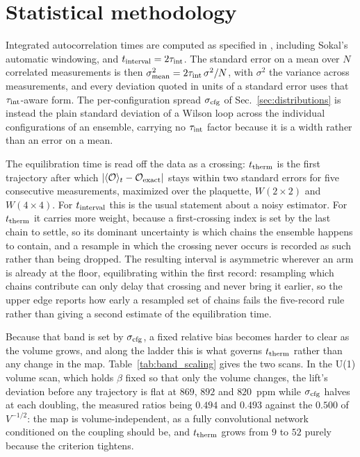 \documentclass[prd, twocolumn, superscriptaddress, nofootinbib,floatfix]{revtex4-2}
\DeclareRobustCommand{\sect}[1]{Sec.~\ref{sec:#1}}
\DeclareRobustCommand{\tb}[1]{Table~\ref{tab:#1}}
\begin{document}
\section{Statistical methodology}
\label{app:stats}

Integrated autocorrelation times are computed as specified in
\cite{madrassokal1988,wolff2004}, including Sokal's automatic windowing, and
$t_{\rm interval}=2\tau_{\rm int}$. The standard error on a mean over $N$
correlated measurements is then
$\sigma_{\rm mean}^2 = 2\tau_{\rm int}\,\sigma^2/N$, with $\sigma^2$ the
variance across measurements, and every deviation quoted in units of a standard
error uses that $\tau_{\rm int}$-aware form. The per-configuration spread
$\sigma_{\rm cfg}$ of \sect{distributions} is instead the plain standard
deviation of a Wilson loop across the individual configurations of an ensemble,
carrying no $\tau_{\rm int}$ factor because it is a width rather than an error
on a mean.

The equilibration time is read off the data as a crossing: $t_{\rm therm}$ is
the first trajectory after which $|\langle\mathcal{O}\rangle_t-\mathcal{O}_{\rm
exact}|$ stays within two standard errors for five consecutive measurements,
maximized over the plaquette, $W(2\times2)$ and $W(4\times4)$. For
$t_{\rm interval}$ this is the usual
statement about a noisy estimator. For $t_{\rm therm}$ it carries more weight,
because a first-crossing index is set by the last chain to settle, so its
dominant uncertainty is which chains the ensemble happens to contain, and a
resample in which the crossing never occurs is recorded as such rather than
being dropped. The resulting interval is asymmetric wherever an arm is already
at the floor, equilibrating within the first record: resampling which chains
contribute can only delay that crossing and never bring it earlier, so the upper
edge reports how early a resampled set of chains fails the five-record rule
rather than giving a second estimate of the equilibration time.

Because that band is set by $\sigma_{\rm cfg}$, a fixed relative bias becomes
harder to clear as the volume grows, and along the ladder this is what governs
$t_{\rm therm}$ rather than any change in the map. \tb{band_scaling} gives the
two scans. In the U(1) volume scan, which holds $\beta$ fixed so that only the
volume changes, the lift's deviation before any trajectory is flat at $869$,
$892$ and $820$~ppm while $\sigma_{\rm cfg}$ halves at each doubling, the
measured ratios being $0.494$ and $0.493$ against the $0.500$ of $V^{-1/2}$: the
map is volume-independent, as a fully convolutional network conditioned on the
coupling should be, and $t_{\rm therm}$ grows from $9$ to $52$ purely because
the criterion tightens.
\end{document}
